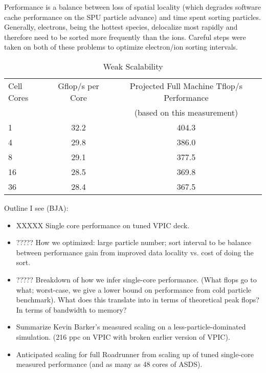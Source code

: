 \documentclass[10pt]{article}
\begin{document}
Performance is a balance between loss of spatial locality (which
degrades software cache performance on the SPU particle advance) and
time spent sorting particles.  Generally, electrons, being the hottest
species, delocalize most rapidly and therefore need to be sorted more
frequently than the ions.  Careful steps were taken on both of these
problems to optimize electron/ion sorting intervals.

\begin{table}
\caption{\label{tbl:ASDS_Weak_Scalability}
Weak Scalability}

\begin{center}
\begin{tabular}{l c c}
\hline
\hline
Cell Cores & Gflop/s per Core & Projected Full Machine Tflop/s Performance \\
 & & (based on this measurement) \\
\hline
1 & 32.2 & 404.3 \\
4 & 29.8 & 386.0 \\
8 & 29.1 & 377.5 \\
16 & 28.5 & 369.8 \\
36 & 28.4 & 367.5 \\
\hline
\end{tabular}
\end{center}
\end{table}

Outline I see (BJA):  
\begin{itemize}
\item XXXXX Single core performance on tuned VPIC deck.

\item ????? How we optimized:  large particle number; sort interval to be 
balance between performance gain from improved data locality vs. 
cost of doing the sort. 

\item ????? Breakdown of how we infer single-core performance.  (What flops go to 
what; worst-case, we give a lower bound on performance from cold particle
benchmark).  What does this translate into in terms of theoretical peak 
flops?  In terms of bandwidth to memory? 

\item Summarize Kevin Barker's measured scaling on a less-particle-dominated 
simulation.  (216 ppc on VPIC with broken earlier version of VPIC). 

\item Anticipated scaling for full Roadrunner from scaling up of tuned 
single-core measured performance (and as many as 48 cores of ASDS).  

\end{itemize}
\end{document}
